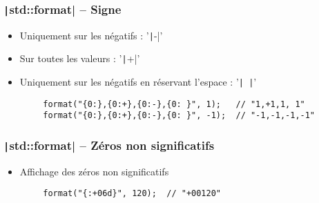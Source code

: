 \documentclass[C++.tex]{subfiles}
\begin{document}
\begin{frame}[fragile]
	\frametitle{\texttt|std::format| -- Signe}
	\begin{itemize}
		\item Uniquement sur les négatifs : '\texttt|-|'


		\item Sur toutes les valeurs : '\texttt|+|'
		\item Uniquement sur les négatifs en réservant l'espace : '\texttt{| |}'
	\end{itemize}

	\begin{verbatim}
		format("{0:},{0:+},{0:-},{0: }", 1);   // "1,+1,1, 1"
		format("{0:},{0:+},{0:-},{0: }", -1);  // "-1,-1,-1,-1"
	\end{verbatim}
\end{frame}

\begin{frame}[fragile]
	\frametitle{\texttt|std::format| -- Zéros non significatifs}
	\begin{itemize}
		\item Affichage des zéros non significatifs
	\end{itemize}

	\begin{verbatim}
		format("{:+06d}", 120);  // "+00120"
	\end{verbatim}
\end{frame}
\end{document}
